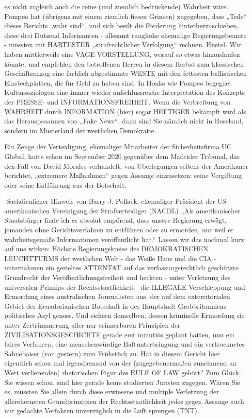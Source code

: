 \begin{multicols}{2}
es nicht zugleich auch die reine (und ziemlich bedrückende) Wahrheit wäre.
Pompeo hat (übrigens mit einem ziemlich fiesen Grinsen) zugegeben, dass „Teile“ dieses Berichts „wahr sind“,
und sich beeilt die Forderung hinterherzuschieben,
diese drei Dutzend Informanten - allesamt ranghohe
ehemalige Regierungsbeamte - müssten mit HÄRTESTER „strafrechtlicher Verfolgung“ rechnen. Hüstel. Wir
haben mittlerweile eine VAGE VORSTELLUNG, worauf
so etwas hinauslaufen könnte, und empfehlen den betroffenen Herren in diesem Herbst zum klassischen Geschäftsanzug eine farblich abgestimmte WESTE mit den
fettesten ballistischen Einsteckplatten, die für Geld zu
haben sind.
In Honks wie Pompeo begegnet Kultursoziologen eine
immer wieder aufschlussreiche Interpretation des Konzepts der PRESSE- und INFORMATIONSFREIHEIT.
Wenn die Verbreitung von WAHRHEIT durch INFORMATION (hier) sogar HEFTIGER bekämpft wird als das
Herausposaunen von „Fake News“, dann sind Sie nämlich nicht in Russland, sondern im Musterland der westlichen Demokratie.

Ein Zeuge der Verteidigung, ehemaliger Mitarbeiter der Sicherheitsfirma UC Global, hatte schon im September
2020 gegenüber dem Madrider Tribunal, das den Fall von David Morales verhandelt, von Überlegungen seitens
der Amerikaner berichtet, „extremere Maßnahmen“ gegen Assange einzusetzen: seine Vergiftung oder seine
Entführung aus der Botschaft.

Sachdienlicher Hinweis von Barry J. Pollack, ehemaliger
Präsident der US-amerikanischen Vereinigung der Strafverteidiger (NACDL)
„Als amerikanischer Staatsbürger finde ich es absolut empörend, dass unsere Regierung erwägt, jemanden ohne
Gerichtsverfahren zu entführen oder zu ermorden, nur
weil er wahrheitsgemäße Informationen veröffentlicht
hat.“
Lassen wir das nochmal kurz auf uns wirken: Höchste
Regierungskreise des DEMOKRATISCHEN LEUCHTTURMS der westlichen Welt - das Weiße Haus und die
CIA - unternahmen ein gezieltes ATTENTAT auf das
verfassungsrechtlich geschützte Grundrecht der Veröffentlichungsfreiheit und heckten - unter Verletzung
des universalen Prinzips der Rechtsstaatlichkeit - die
ILLEGALE Verschleppung und Ermordung eines australischen Journalisten aus, der auf dem exterritorialen Gebiet der Ecuadorianischen Botschaft in der Hauptstadt
Grobbritanniens politisches Asyl genoss.
Und sichern demselben, dessen kriminelle Ermordung
sie unter Zertrümmerung aller nur erinnerbaren Prinzipien der ZIVILISATIONSGESCHICHTE gerade erst
minutiös geplant hatten, nun ein faires Verfahren, eine
menschenwürdige Haftunterbringung und ein vertrocknetes Sahnebaiser (von gestern) zum Frühstück zu.
Hat in diesem Gericht hier eigentlich schon mal irgendjemand von der (zugegebenermaßen zunehmend an
Wert verlierenden) rhetorischen Figur des RULE OF LAW
gehört? Zum Glück, Sie wissen schon, sind hier gerade
keine studierten Juristen zugegen. Wären Sie es, müssten
Sie allein durch diese erwiesene und multiple Verletzung
der allerehernsten Grundprinzipien der Rechtsstaatlichkeit jedes gegen Assange auch nur gedachte Verfahren
unverzüglich in die Luft sprengen (TNT).


\end{multicols}
